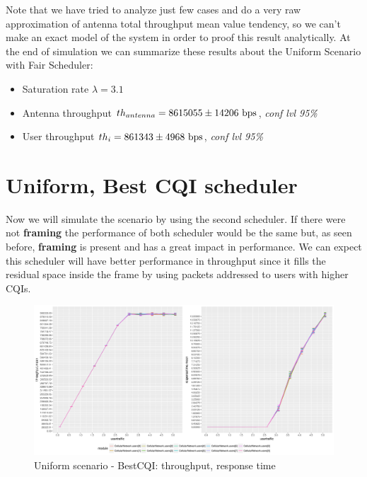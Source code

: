 

Note that we have tried to analyze just few cases and do a very raw approximation of antenna total throughput mean value tendency, so we can't make an exact model of the system in order to proof this result analytically. 
At the end of simulation we can summarize these results about the Uniform Scenario with Fair Scheduler:
\begin{itemize}
	\item Saturation rate \(\lambda = 3.1\)
	\item Antenna throughput \(th_{antenna} = 8615055 \pm 14206 \textnormal{ bps}\), \textit{conf lvl 95\%}
	\item User throughput \(th_{i} = 861343 \pm 4968 \textnormal{ bps}\), \textit{conf lvl 95\%}
\end{itemize} 

\section{Uniform, Best CQI scheduler}
Now we will simulate the scenario by using the second scheduler. If there were not \textbf{framing} the performance of both scheduler would be the same but, as seen before, \textbf{framing} is present and has a great impact in performance. We can expect this scheduler will have better performance in throughput since it fills the residual space inside the frame by using packets addressed to users with higher CQIs.
\begin{figure}[H]
  \includegraphics[width=1\textwidth]{images/unifbest}
   \caption{Uniform scenario - BestCQI: throughput, response time}
  \label{fig:Uniform scenario - BestCQI: throughput, response time}
\end{figure}


